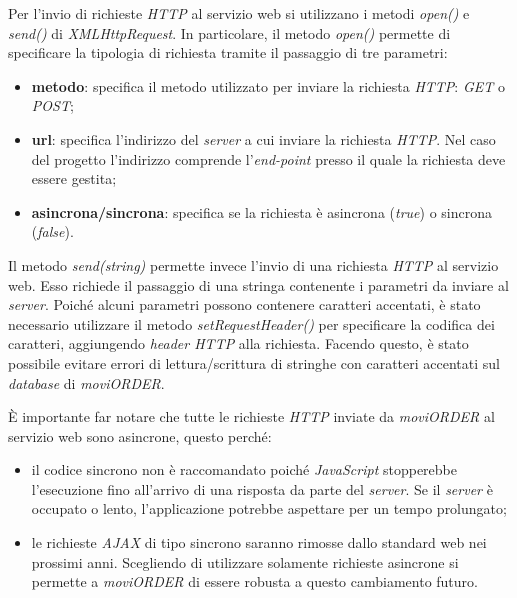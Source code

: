 Per l'invio di richieste \textit{HTTP} al servizio web si utilizzano i metodi \textit{open()} e \textit{send()} di \textit{XMLHttpRequest}. In particolare, il metodo \textit{open()} permette di specificare la tipologia di richiesta tramite il passaggio di tre parametri:
	\begin{itemize}
		\item \textbf{metodo}: specifica il metodo utilizzato per inviare la richiesta \textit{HTTP}: \textit{GET} o \textit{POST};
		\item \textbf{url}: specifica l'indirizzo del \textit{server} a cui inviare la richiesta \textit{HTTP}. Nel caso del progetto l'indirizzo comprende l'\textit{end-point} presso il quale la richiesta deve essere gestita;
		\item \textbf{asincrona/sincrona}: specifica se la richiesta è asincrona (\textit{true}) o sincrona (\textit{false}).
	\end{itemize}
Il metodo \textit{send(string)} permette invece l'invio di una richiesta \textit{HTTP} al servizio web. Esso richiede il passaggio di una stringa contenente i parametri da inviare al \textit{server}. Poiché alcuni parametri possono contenere caratteri accentati, è stato necessario utilizzare il metodo \textit{setRequestHeader()} per specificare la codifica dei caratteri, aggiungendo \textit{header HTTP} alla richiesta. Facendo questo, è stato possibile evitare errori di lettura/scrittura di stringhe con caratteri accentati sul \textit{database} di \textit{moviORDER}. 

È importante far notare che tutte le richieste \textit{HTTP} inviate da \textit{moviORDER} al servizio web sono asincrone, questo perché:
\begin{itemize}
	\item il codice sincrono non è raccomandato poiché \textit{JavaScript} stopperebbe l'esecuzione fino all'arrivo di una risposta da parte del \textit{server}. Se il \textit{server} è occupato o lento, l'applicazione potrebbe aspettare per un tempo prolungato;
	\item le richieste \textit{AJAX} di tipo sincrono saranno rimosse dallo standard web nei prossimi anni. Scegliendo di utilizzare solamente richieste asincrone si permette a \textit{moviORDER} di essere robusta a questo cambiamento futuro.
\end{itemize} 

